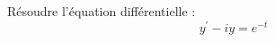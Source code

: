 R\'esoudre l'\'equation diff\'erentielle :
\begin{displaymath}
 y^\prime -i y = e^{-t}
\end{displaymath}
\bigskip
